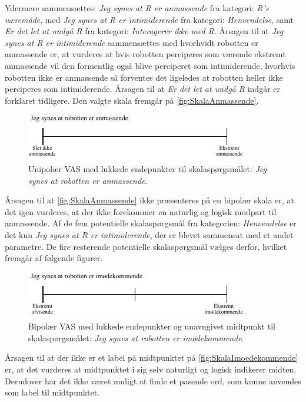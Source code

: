 Ydermere sammensættes: \textit{Jeg synes at R er anmassende} fra kategori: \textit{R's væremåde}, med \textit{Jeg synes at R er intimiderende} fra kategori: \textit{Henvendelse}, samt \textit{Er det let at undgå R} fra kategori: \textit{Interagerer ikke med R}. Årsagen til at \textit{Jeg synes at R er intimiderende} sammensættes med hvorhvidt robotten er anmassende er, at vurderes at hvis robotten perciperes som værende ekstremt anmassende vil den formentlig også blive perciperet som intimiderende, hvorhvis robotten ikke er anmassende så forventes det ligeledes at robotten heller ikke perciperes som intimiderende. Årsagen til at \textit{Er det let at undgå R} indgår er forklaret tidligere. Den valgte skala fremgår på \autoref{fig:SkalaAnmassende}.  
%
\begin{figure}[H]
\centering
\includegraphics[width =\textwidth]{Figure/UdvalgteSkalaer/Anmassende} 
\caption{Unipolær VAS med lukkede endepunkter til skalaspørgsmålet: \textit{Jeg synes at robotten er anmassende}.}
\label{fig:SkalaAnmassende}
\end{figure}
\noindent
%
Årsagen til at \autoref{fig:SkalaAnmassende} ikke præsenteres på en bipolær skala er, at det igen vurderes, at der ikke forekommer en naturlig og logisk modpart til anmassende. Af de fem potentielle skalaspørgsmål fra kategorien: \textit{Henvendelse} er det kun \textit{Jeg synes at R er intimiderende}, der er blevet sammensat med et andet parametre. De fire resterende potentielle skalaspørgsmål vælges derfor, hvilket fremgår af følgende figurer.    
%
\begin{figure}[H]
\centering
\includegraphics[width =\textwidth]{Figure/UdvalgteSkalaer/Imoedekommende} 
\caption{Bipolær VAS med lukkede endepunkter og unavngivet midtpunkt til skalaspørgsmålet: \textit{Jeg synes at robotten er imødekommende}.}
\label{fig:SkalaImoedekommende}
\end{figure}
\noindent
%
Årsagen til at der ikke er et label på midtpunktet på \autoref{fig:SkalaImoedekommende} er, at det vurderes at midtpunktet i sig selv naturligt og logisk indikerer midten. Derudover har det ikke været muligt at finde et pasende ord, som kunne anvendes som label til midtpunktet.
